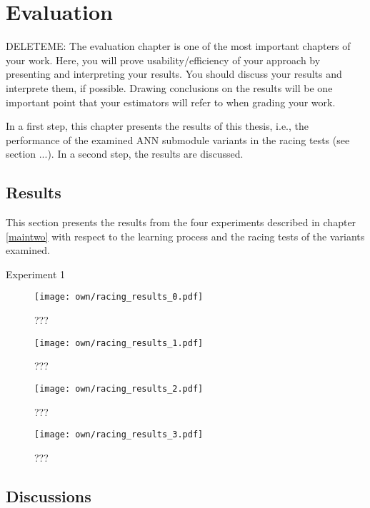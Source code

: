 \chapter{Evaluation}
\label{evaluation}
DELETEME: The evaluation chapter is one of the most important chapters of your work. Here, you will prove usability/efficiency of your approach by presenting and interpreting your results. You should discuss your results and interprete them, if possible. Drawing conclusions on the results will be one important point that your estimators will refer to when grading your work.

In a first step, this chapter presents the results of this thesis,
i.e., the performance of the examined ANN submodule variants
in the racing tests (see section ...).
In a second step, the results are discussed.

\section{Results}
\label{results}
This section presents the results
from the four experiments
described in chapter \ref{maintwo}
with respect to the learning process
and the racing tests of the variants examined.

Experiment 1 





\begin{figure}
    \centering
    \texttt{[image: own/racing\_results\_0.pdf]}
    \caption[
        ???
    ]{
        ???
    \label{fig:?}}
\end{figure}

\begin{figure}
    \centering
    \texttt{[image: own/racing\_results\_1.pdf]}
    \caption[
        ???
    ]{
        ???
    \label{fig:?}}
\end{figure}

\begin{figure}
    \centering
    \texttt{[image: own/racing\_results\_2.pdf]}
    \caption[
        ???
    ]{
        ???
    \label{fig:?}}
\end{figure}

\begin{figure}
    \centering
    \texttt{[image: own/racing\_results\_3.pdf]}
    \caption[
        ???
    ]{
        ???
    \label{fig:?}}
\end{figure}


\section{Discussions}
\label{discussions}